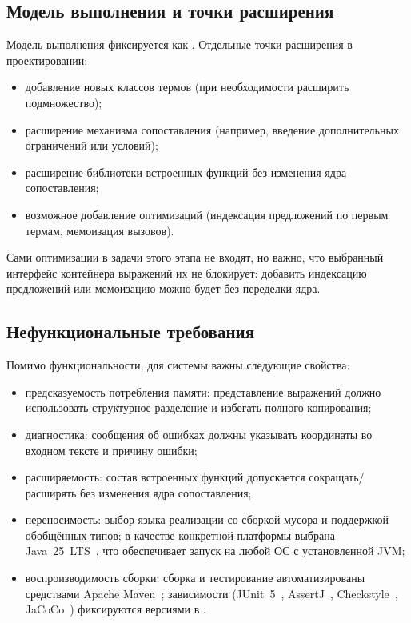 \subsection{Модель выполнения и точки расширения}

Модель выполнения фиксируется как .
Отдельные точки расширения в проектировании:
\begin{itemize}
  \item добавление новых классов термов (при необходимости расширить подмножество);
  \item расширение механизма сопоставления (например, введение дополнительных ограничений или условий);
  \item расширение библиотеки встроенных функций без изменения ядра сопоставления;
  \item возможное добавление оптимизаций (индексация предложений по первым термам, мемоизация вызовов).
\end{itemize}

Сами оптимизации в задачи этого этапа не входят, но важно, что выбранный интерфейс
контейнера выражений их не блокирует: добавить индексацию предложений или мемоизацию можно
будет без переделки ядра.

\subsection{Нефункциональные требования}

Помимо функциональности, для системы важны следующие свойства:
\begin{itemize}
  \item предсказуемость потребления памяти: представление выражений должно использовать структурное разделение и избегать полного копирования;
  \item диагностика: сообщения об ошибках должны указывать координаты во входном тексте и причину ошибки;
  \item расширяемость: состав встроенных функций допускается сокращать/расширять без изменения ядра сопоставления;
  \item переносимость: выбор языка реализации со сборкой мусора и поддержкой
        обобщённых типов; в качестве конкретной платформы выбрана Java~25~LTS~\cite{java_se25_spec},
        что обеспечивает запуск на любой ОС с установленной JVM;
  \item воспроизводимость сборки: сборка и тестирование автоматизированы средствами
        Apache Maven~\cite{maven_guide}; зависимости (JUnit~5~\cite{junit5_guide},
        AssertJ~\cite{assertj_docs}, Checkstyle~\cite{checkstyle_docs},
        JaCoCo~\cite{jacoco_docs}) фиксируются версиями в .
\end{itemize}

